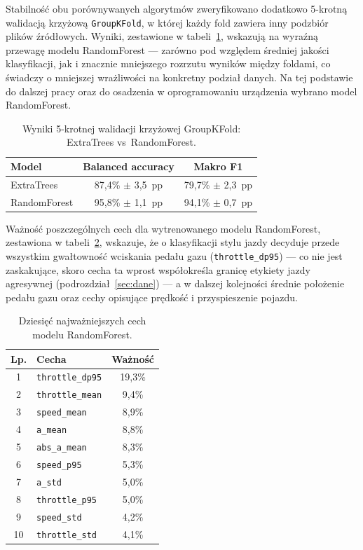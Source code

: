 Stabilność obu porównywanych algorytmów zweryfikowano dodatkowo 5-krotną
walidacją krzyżową \texttt{GroupKFold}, w której każdy fold zawiera inny
podzbiór plików źródłowych. Wyniki, zestawione w tabeli~\ref{tab:cv}, wskazują
na wyraźną przewagę modelu RandomForest --- zarówno pod względem średniej
jakości klasyfikacji, jak i znacznie mniejszego rozrzutu wyników między
foldami, co świadczy o mniejszej wrażliwości na konkretny podział danych. Na
tej podstawie do dalszej pracy oraz do osadzenia w oprogramowaniu urządzenia
wybrano model RandomForest.

\begin{table}[!h]
    \centering
    \caption{Wyniki 5-krotnej walidacji krzyżowej GroupKFold: ExtraTrees vs~RandomForest.}
    \label{tab:cv}
    \begin{tabular}{| l | c | c |} \hline
        \textbf{Model} & \textbf{Balanced accuracy} & \textbf{Makro F1} \\ \hline\hline
        ExtraTrees   & 87,4\% $\pm$ 3,5~pp & 79,7\% $\pm$ 2,3~pp \\ \hline
        RandomForest & 95,8\% $\pm$ 1,1~pp & 94,1\% $\pm$ 0,7~pp \\ \hline
    \end{tabular}
\end{table}

Ważność poszczególnych cech dla wytrenowanego modelu RandomForest, zestawiona
w tabeli~\ref{tab:waznosc-cech}, wskazuje, że o klasyfikacji stylu jazdy
decyduje przede wszystkim gwałtowność wciskania pedału gazu
(\texttt{throttle\_dp95}) --- co nie jest zaskakujące, skoro cecha ta wprost
współokreśla granicę etykiety jazdy agresywnej (podrozdział~\ref{sec:dane})
--- a w dalszej kolejności średnie położenie pedału gazu oraz cechy opisujące
prędkość i przyspieszenie pojazdu.

\begin{table}[!h]
    \centering
    \caption{Dziesięć najważniejszych cech modelu RandomForest.}
    \label{tab:waznosc-cech}
    \begin{tabular}{| c | l | c |} \hline
        \textbf{Lp.} & \textbf{Cecha} & \textbf{Ważność} \\ \hline\hline
        1  & \texttt{throttle\_dp95} & 19,3\% \\ \hline
        2  & \texttt{throttle\_mean} & 9,4\%  \\ \hline
        3  & \texttt{speed\_mean}    & 8,9\%  \\ \hline
        4  & \texttt{a\_mean}        & 8,8\%  \\ \hline
        5  & \texttt{abs\_a\_mean}   & 8,3\%  \\ \hline
        6  & \texttt{speed\_p95}     & 5,3\%  \\ \hline
        7  & \texttt{a\_std}         & 5,0\%  \\ \hline
        8  & \texttt{throttle\_p95}  & 5,0\%  \\ \hline
        9  & \texttt{speed\_std}     & 4,2\%  \\ \hline
        10 & \texttt{throttle\_std}  & 4,1\%  \\ \hline
    \end{tabular}
\end{table}

